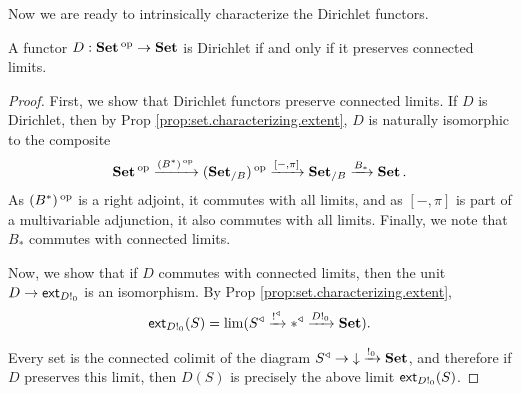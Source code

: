 Now we are ready to intrinsically characterize the Dirichlet functors.
\begin{thm}
A functor $D : \operatorname{\textbf{Set}}\operatorname{^\text{op}} \to \operatorname{\textbf{Set}}$ is Dirichlet if and only if it preserves
connected limits. 
\end{thm}
\begin{proof}
First, we show that Dirichlet functors preserve connected limits. If $D$ is
Dirichlet, then by Prop \ref{prop:set.characterizing.extent}, $D$ is naturally
isomorphic to the composite
$$\operatorname{\textbf{Set}}\operatorname{^\text{op}} \xrightarrow{(B^{\ast})\operatorname{^\text{op}}} (\operatorname{\textbf{Set}}_{/B})\operatorname{^\text{op}} \xrightarrow{[-, \pi]} \operatorname{\textbf{Set}}_{/B}
\xrightarrow{B_\ast} \operatorname{\textbf{Set}}.$$
As $(B^{\ast})\operatorname{^\text{op}}$ is a right adjoint, it commutes with all limits, and as $[-,\pi]$
is part of a multivariable adjunction, it also commutes with all limits.
Finally, we note that $B_{\ast}$ commutes with connected limits.

Now, we show that if $D$ commutes with connected limits, then the unit
$D \to \operatorname{\mathsf{{ext}}}_{D!_0}$ is an isomorphism. By Prop
\ref{prop:set.characterizing.extent}, 
  $$\operatorname{\mathsf{{ext}}}_{D!_0}(S) = \lim(S^{\triangleleft} \xrightarrow{!^{\triangleleft}} \ast^{\triangleleft}
  \xrightarrow{D!_0} \operatorname{\textbf{Set}}).$$
  
Every set is the connected colimit of the diagram $S^{\triangleleft} \to
\mathbin{\downarrow} \xrightarrow{!_0} \operatorname{\textbf{Set}}$, and therefore if $D$ preserves this limit, then
$D(S)$ is precisely the above limit $\operatorname{\mathsf{{ext}}}_{D!_0}(S)$.
\end{proof}

